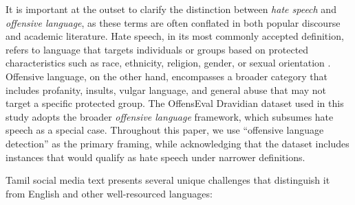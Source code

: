 \documentclass[12pt, a4paper]{article}
\begin{document}
It is important at the outset to clarify the distinction between \textit{hate speech} and \textit{offensive language}, as these terms are often conflated in both popular discourse and academic literature. Hate speech, in its most commonly accepted definition, refers to language that targets individuals or groups based on protected characteristics such as race, ethnicity, religion, gender, or sexual orientation \citep{davidson2017automated}. Offensive language, on the other hand, encompasses a broader category that includes profanity, insults, vulgar language, and general abuse that may not target a specific protected group. The OffensEval Dravidian dataset used in this study adopts the broader \textit{offensive language} framework, which subsumes hate speech as a special case. Throughout this paper, we use ``offensive language detection'' as the primary framing, while acknowledging that the dataset includes instances that would qualify as hate speech under narrower definitions.

Tamil social media text presents several unique challenges that distinguish it from English and other well-resourced languages:
\end{document}
